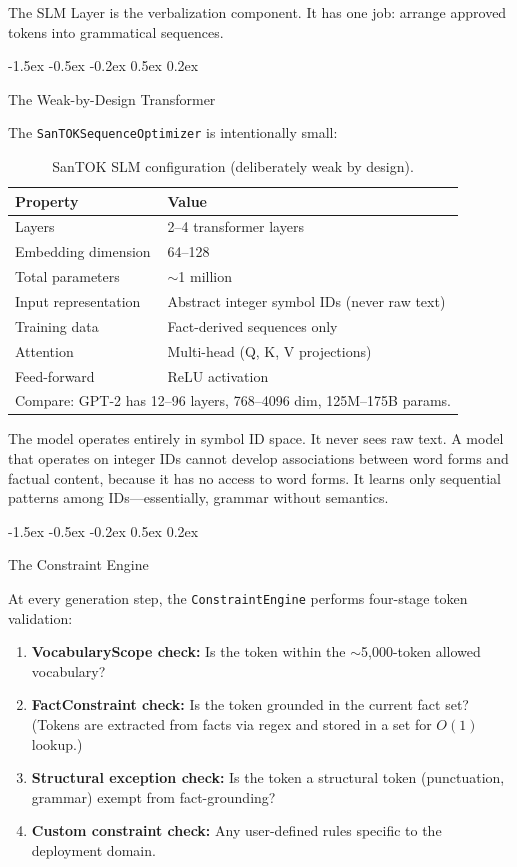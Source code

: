 \documentclass[10pt]{article}
\makeatletter
\renewcommand{\subsubsection}{\@startsection{subsubsection}{3}{\z@}%
  {-1.5ex \@plus -0.5ex \@minus -0.2ex}%
  {0.5ex \@plus 0.2ex}%
  {\normalsize\bfseries\raggedright}}
\makeatother
\begin{document}
The SLM Layer is the verbalization component. It has one job: arrange approved
tokens into grammatical sequences.

\subsubsection{The Weak-by-Design Transformer}

The \texttt{SanTOKSequenceOptimizer} is intentionally small:

\begin{table}[t]
\centering
\caption{SanTOK SLM configuration (deliberately weak by design).}
\label{tab:slm}
\begin{tabular}{ll}
\toprule
\textbf{Property} & \textbf{Value} \\
\midrule
Layers & 2--4 transformer layers \\
Embedding dimension & 64--128 \\
Total parameters & $\sim$1 million \\
Input representation & Abstract integer symbol IDs (never raw text) \\
Training data & Fact-derived sequences only \\
Attention & Multi-head (Q, K, V projections) \\
Feed-forward & ReLU activation \\
\midrule
\multicolumn{2}{l}{\footnotesize Compare: GPT-2 has 12--96 layers, 768--4096 dim, 125M--175B params.} \\
\bottomrule
\end{tabular}
\end{table}

The model operates entirely in symbol ID space. It never sees raw text. A model that
operates on integer IDs cannot develop associations between word forms and factual
content, because it has no access to word forms. It learns only sequential patterns
among IDs---essentially, grammar without semantics.

\subsubsection{The Constraint Engine}

At every generation step, the \texttt{ConstraintEngine} performs four-stage token
validation:

\begin{enumerate}
  \item \textbf{VocabularyScope check:} Is the token within the $\sim$5,000-token
        allowed vocabulary?
  \item \textbf{FactConstraint check:} Is the token grounded in the current fact set?
        (Tokens are extracted from facts via regex and stored in a set for $O(1)$
        lookup.)
  \item \textbf{Structural exception check:} Is the token a structural token
        (punctuation, grammar) exempt from fact-grounding?
  \item \textbf{Custom constraint check:} Any user-defined rules specific to the
        deployment domain.
\end{enumerate}
\end{document}

